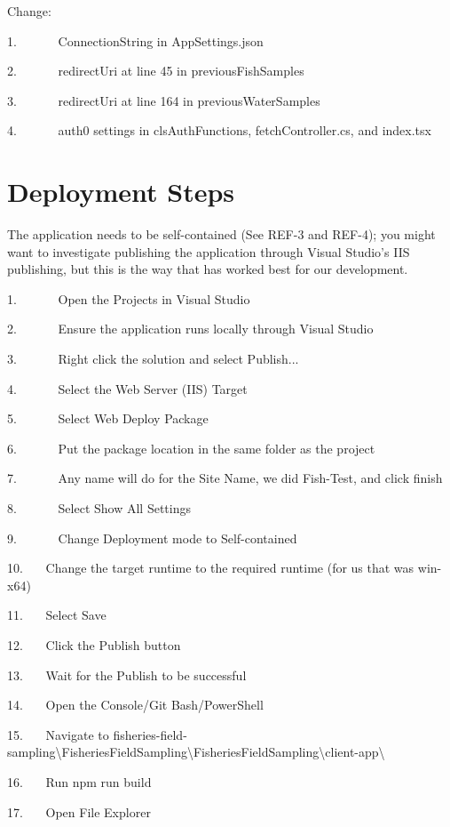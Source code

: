\documentclass[
  letterpaper,
  DIV=11,
  numbers=noendperiod]{scrreprt}
\begin{document}
Change:

1.~~~~~~ ConnectionString in AppSettings.json

2.~~~~~~ redirectUri at line 45 in previousFishSamples

3. ~~~~~~redirectUri at line 164 in previousWaterSamples

4.~~~~~~ auth0 settings in clsAuthFunctions, fetchController.cs, and
index.tsx

\section{\texorpdfstring{\textbf{Deployment
Steps}}{Deployment Steps}}\label{deployment-steps}

The application needs to be self-contained (See REF-3 and REF-4); you
might want to investigate publishing the application through Visual
Studio's IIS publishing, but this is the way that has worked best for
our development.

1.~~~~~~ Open the Projects in Visual Studio

2.~~~~~~ Ensure the application runs locally through Visual Studio

3.~~~~~~ Right click the solution and select Publish...

4.~~~~~~ Select the Web Server (IIS) Target

5.~~~~~~ Select Web Deploy Package

6.~~~~~~ Put the package location in the same folder as the project

7.~~~~~~ Any name will do for the Site Name, we did Fish-Test, and click
finish

8.~~~~~~ Select Show All Settings

9.~~~~~~ Change Deployment mode to Self-contained

10.~~~ Change the target runtime to the required runtime (for us that
was win-x64)

11.~~~ Select Save

12.~~~ Click the Publish button

13.~~~ Wait for the Publish to be successful

14.~~~ Open the Console/Git Bash/PowerShell

15.~~~ Navigate to
fisheries-field-sampling\textbackslash FisheriesFieldSampling\textbackslash FisheriesFieldSampling\textbackslash client-app\textbackslash~

16.~~~ Run npm run build

17.~~~ Open File Explorer
\end{document}
